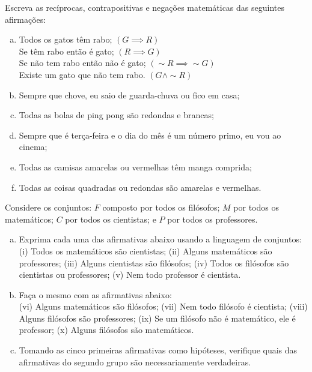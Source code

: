 \begin{exercise}
\label{exe:escrever-reciprocas}
Escreva as recíprocas, contrapositivas e negações
matemáticas das seguintes afirmações:
\begin{enumerate}[a.]
  \item Todos os gatos têm rabo; $\left(G \implies R \right)$\\
   Se têm rabo então é gato; $\left(R \implies G \right)$\\
   Se não tem rabo então não é gato; $\left(\sim R \implies \sim G \right)$\\
   Existe um gato que não tem rabo. $\left(G \land \sim R \right)$
  \item Sempre que chove, eu saio de guarda-chuva ou fico em casa;
  \item Todas as bolas de ping pong são redondas e brancas;
  \item Sempre que é terça-feira e o dia do mês é um número primo,
  eu vou ao cinema;
  \item Todas as camisas amarelas ou vermelhas têm manga comprida;
  \item Todas as coisas quadradas ou redondas são amarelas e
  vermelhas.
\end{enumerate}
\end{exercise}

\begin{exercise}
Considere os conjuntos: $F$ composto por todos os filósofos;
$M$ por todos os matemáticos; $C$ por todos os cientistas; e $P$ por
todos os professores.
\begin{enumerate}[a.]
  \item Exprima cada uma das afirmativas abaixo usando a linguagem
  de conjuntos: \\
  (i) Todos os matemáticos são cientistas; (ii) Alguns matemáticos
  são professores; (iii) Alguns cientistas são filósofos; (iv) Todos
  os filósofos são cientistas ou professores; (v) Nem todo professor
  é cientista.
  \item Faça o mesmo com as afirmativas abaixo: \\
  (vi) Alguns matemáticos são filósofos; (vii) Nem todo filósofo é
  cientista; (viii) Alguns filósofos são professores; (ix) Se um
  filósofo não é matemático, ele é professor; (x) Alguns filósofos
  são matemáticos.
  \item Tomando as cinco primeiras afirmativas como hipóteses,
  verifique quais das afirmativas do segundo grupo são
  necessariamente verdadeiras.
\end{enumerate}
\end{exercise}

